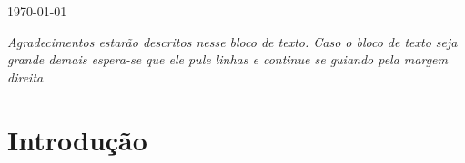 \documentclass[11pt]{article}
\begin{document}
\begin{titlepage}


{\large \today}\\[3cm] %


 

\vfill %

\end{titlepage}

\newpage %

\begin{flushright}

\vspace*{\fill}

\textit{\LARGE Agradecimentos estarão descritos nesse bloco de texto. Caso o bloco de texto seja grande demais espera-se que ele pule linhas e continue se guiando pela margem direita}

\vspace*{\fill}

\end{flushright}

\newpage

\tableofcontents{}

\newpage

\section{Introdução}	
\end{document}
